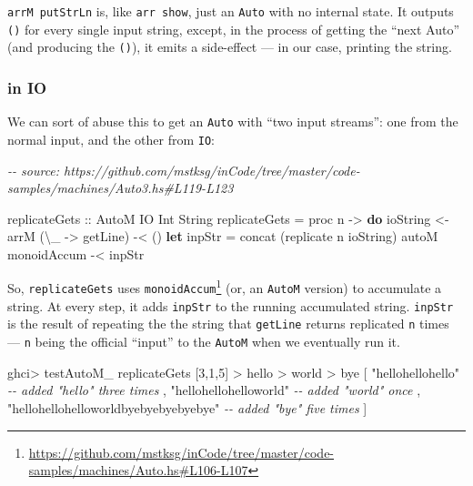 \documentclass[]{article}
\newenvironment{Shaded}{}{}
\newcommand{\CommentTok}[1]{\textcolor[rgb]{0.38,0.63,0.69}{\textit{#1}}}
\newcommand{\DataTypeTok}[1]{\textcolor[rgb]{0.56,0.13,0.00}{#1}}
\newcommand{\DecValTok}[1]{\textcolor[rgb]{0.25,0.63,0.44}{#1}}
\newcommand{\FunctionTok}[1]{\textcolor[rgb]{0.02,0.16,0.49}{#1}}
\newcommand{\KeywordTok}[1]{\textcolor[rgb]{0.00,0.44,0.13}{\textbf{#1}}}
\newcommand{\NormalTok}[1]{#1}
\newcommand{\OperatorTok}[1]{\textcolor[rgb]{0.40,0.40,0.40}{#1}}
\newcommand{\OtherTok}[1]{\textcolor[rgb]{0.00,0.44,0.13}{#1}}
\newcommand{\StringTok}[1]{\textcolor[rgb]{0.25,0.44,0.63}{#1}}
\renewcommand{\href}[2]{#2\footnote{\url{#1}}}
\begin{document}
\texttt{arrM\ putStrLn} is, like \texttt{arr\ show}, just an \texttt{Auto} with
no internal state. It outputs \texttt{()} for every single input string, except,
in the process of getting the ``next Auto'' (and producing the \texttt{()}), it
emits a side-effect --- in our case, printing the string.

\hypertarget{in-io}{%
\subsubsection{in IO}\label{in-io}}

We can sort of abuse this to get an \texttt{Auto} with ``two input streams'':
one from the normal input, and the other from \texttt{IO}:

\begin{Shaded}
\begin{Highlighting}[]
\CommentTok{{-}{-} source: https://github.com/mstksg/inCode/tree/master/code{-}samples/machines/Auto3.hs\#L119{-}L123}

\OtherTok{replicateGets ::} \DataTypeTok{AutoM} \DataTypeTok{IO} \DataTypeTok{Int} \DataTypeTok{String}
\NormalTok{replicateGets }\OtherTok{=}\NormalTok{ proc n }\OtherTok{{-}>} \KeywordTok{do}
\NormalTok{    ioString }\OtherTok{<{-}}\NormalTok{ arrM (\textbackslash{}\_ }\OtherTok{{-}>} \FunctionTok{getLine}\NormalTok{) }\OperatorTok{{-}<}\NormalTok{ ()}
    \KeywordTok{let}\NormalTok{ inpStr }\OtherTok{=} \FunctionTok{concat}\NormalTok{ (}\FunctionTok{replicate}\NormalTok{ n ioString)}
\NormalTok{    autoM monoidAccum }\OperatorTok{{-}<}\NormalTok{ inpStr}
\end{Highlighting}
\end{Shaded}

So, \texttt{replicateGets} uses
\href{https://github.com/mstksg/inCode/tree/master/code-samples/machines/Auto.hs\#L106-L107}{\texttt{monoidAccum}}
(or, an \texttt{AutoM} version) to accumulate a string. At every step, it adds
\texttt{inpStr} to the running accumulated string. \texttt{inpStr} is the result
of repeating the the string that \texttt{getLine} returns replicated \texttt{n}
times --- \texttt{n} being the official ``input'' to the \texttt{AutoM} when we
eventually run it.

\begin{Shaded}
\begin{Highlighting}[]
\NormalTok{ghci}\OperatorTok{>}\NormalTok{ testAutoM\_ replicateGets [}\DecValTok{3}\NormalTok{,}\DecValTok{1}\NormalTok{,}\DecValTok{5}\NormalTok{]}
\OperatorTok{>}\NormalTok{ hello}
\OperatorTok{>}\NormalTok{ world}
\OperatorTok{>}\NormalTok{ bye}
\NormalTok{[ }\StringTok{"hellohellohello"}         \CommentTok{{-}{-} added "hello" three times}
\NormalTok{, }\StringTok{"hellohellohelloworld"}    \CommentTok{{-}{-} added "world" once}
\NormalTok{, }\StringTok{"hellohellohelloworldbyebyebyebyebye"}     \CommentTok{{-}{-} added "bye" five times}
\NormalTok{]}
\end{Highlighting}
\end{Shaded}
\end{document}

